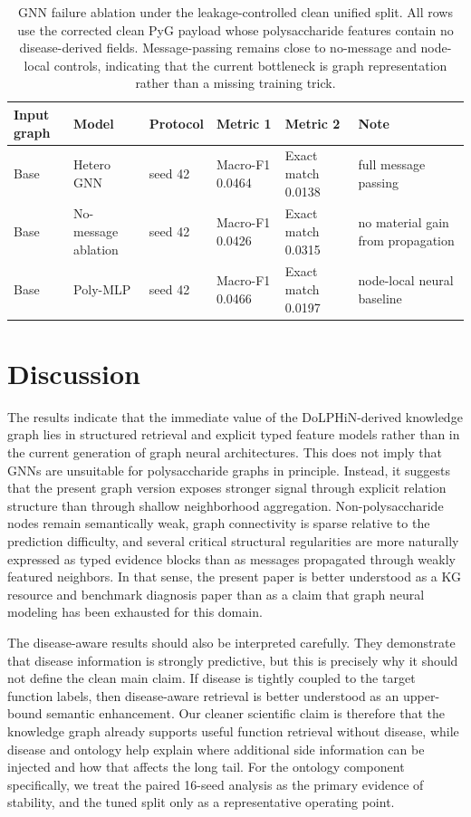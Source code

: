 \documentclass[11pt]{article}
\begin{document}
\begin{table}[t]
\centering
\caption{GNN failure ablation under the leakage-controlled clean unified split. All rows use the corrected clean PyG payload whose polysaccharide features contain no disease-derived fields. Message-passing remains close to no-message and node-local controls, indicating that the current bottleneck is graph representation rather than a missing training trick.}
\label{tab:gnn-ablation}
\begin{tabularx}{\textwidth}{>{\raggedright\arraybackslash}p{2.2cm}>{\raggedright\arraybackslash}p{2.2cm}>{\raggedright\arraybackslash}p{1.9cm}XXX}
\toprule
Input graph & Model & Protocol & Metric 1 & Metric 2 & Note \\
\midrule
Base & Hetero GNN & seed 42 & Macro-F1 0.0464 & Exact match 0.0138 & full message passing \\
Base & No-message ablation & seed 42 & Macro-F1 0.0426 & Exact match 0.0315 & no material gain from propagation \\
Base & Poly-MLP & seed 42 & Macro-F1 0.0466 & Exact match 0.0197 & node-local neural baseline \\
\bottomrule
\end{tabularx}
\end{table}

\section{Discussion}
\label{sec:discussion}

The results indicate that the immediate value of the DoLPHiN-derived knowledge graph lies in structured retrieval and explicit typed feature models rather than in the current generation of graph neural architectures. This does not imply that GNNs are unsuitable for polysaccharide graphs in principle. Instead, it suggests that the present graph version exposes stronger signal through explicit relation structure than through shallow neighborhood aggregation. Non-polysaccharide nodes remain semantically weak, graph connectivity is sparse relative to the prediction difficulty, and several critical structural regularities are more naturally expressed as typed evidence blocks than as messages propagated through weakly featured neighbors. In that sense, the present paper is better understood as a KG resource and benchmark diagnosis paper than as a claim that graph neural modeling has been exhausted for this domain.

The disease-aware results should also be interpreted carefully. They demonstrate that disease information is strongly predictive, but this is precisely why it should not define the clean main claim. If disease is tightly coupled to the target function labels, then disease-aware retrieval is better understood as an upper-bound semantic enhancement. Our cleaner scientific claim is therefore that the knowledge graph already supports useful function retrieval without disease, while disease and ontology help explain where additional side information can be injected and how that affects the long tail. For the ontology component specifically, we treat the paired 16-seed analysis as the primary evidence of stability, and the tuned split only as a representative operating point.
\end{document}

